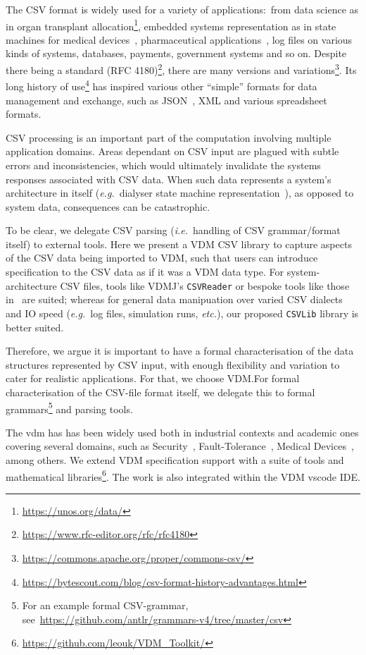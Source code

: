 \documentclass[runningheads,a4paper]{llncs}
\begin{document}
The \gls{CSV} format is widely used for a variety of applications:~from data science as in organ transplant allocation\footnote{\url{https://unos.org/data/}}, embedded systems representation as in state machines for medical devices~\cite{alastairMSc,scp-dialyser}, pharmaceutical applications~\cite{csv-validation-pharma-msc}, log files on various kinds of systems, databases, payments, government systems and so on. Despite there being a standard (RFC 4180)\footnote{\url{https://www.rfc-editor.org/rfc/rfc4180}}, there are many versions and variations\footnote{\url{https://commons.apache.org/proper/commons-csv/}}. Its long history of use\footnote{\url{https://bytescout.com/blog/csv-format-history-advantages.html}} has inspired various other ``simple'' formats for data management and exchange, such as JSON~\cite{JSON}, XML and various spreadsheet formats. 

CSV processing is an important part of the computation involving multiple application domains. Areas dependant on CSV input are plagued with subtle errors and inconsistencies, which would ultimately invalidate the systems responses associated with CSV data. When such data represents a system's architecture in itself (\textit{e.g.}~dialyser state machine representation~\cite{scp-dialyser}), as opposed to system data, consequences can be catastrophic. 

To be clear, we delegate CSV parsing (\textit{i.e.}~handling of CSV grammar/format itself) to external tools. Here we present a VDM CSV library to capture aspects of the CSV data being imported to VDM, such that users can introduce specification to the CSV data as if it was a VDM data type. For system-architecture CSV files, tools like VDMJ's \texttt{CSVReader} or bespoke tools like those in~\cite{egleUG,alastairMSc,emv2} are suited; whereas for general data manipuation over varied CSV dialects and IO speed (\textit{e.g.}~log files, simulation runs, \textit{etc.}), our proposed \texttt{CSVLib} library is better suited.

Therefore, we argue it is important to have a formal characterisation of the data structures represented by CSV input, with enough flexibility and variation to cater for realistic applications. For that, we choose VDM.\@ For formal characterisation of the CSV-file format itself, we delegate this to formal grammars\footnote{For an example formal CSV-grammar, see~\url{https://github.com/antlr/grammars-v4/tree/master/csv}} and parsing tools.\@ 

The \gls{vdm} has has been widely used both in industrial contexts and academic ones covering several domains, such as Security~\cite{Kulik&20,Kulik&21a}, Fault-Tolerance~\cite{Nilsson&18}, Medical Devices~\cite{Macedo&08}, among others. We extend VDM specification support with a suite of tools and mathematical libraries\footnote{\url{https://github.com/leouk/VDM_Toolkit/}}. The work is also integrated within the VDM \gls{vscode} IDE.\@
\end{document}

